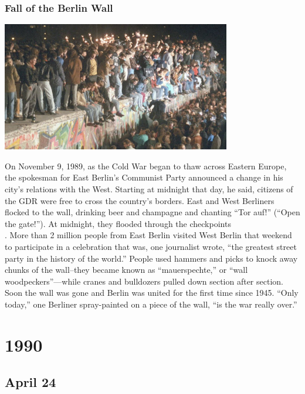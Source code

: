 \documentclass[11pt]{report}
\begin{document}
\subsection{Fall of the Berlin Wall}
\vspace{2mm}\begin{center}\includegraphics[width=10cm]{./img/fallBerlinWall.jpg}\end{center}
On November 9, 1989, as the Cold War began to thaw across Eastern Europe, the spokesman for East Berlin’s Communist Party announced a change in his city’s relations with the West. Starting at midnight that day, he said, citizens of the GDR were free to cross the country’s borders. East and West Berliners flocked to the wall, drinking beer and champagne and chanting “Tor auf!” (“Open the gate!”). At midnight, they flooded through the checkpoints\\.
\indent More than 2 million people from East Berlin visited West Berlin that weekend to participate in a celebration that was, one journalist wrote, “the greatest street party in the history of the world.” People used hammers and picks to knock away chunks of the wall–they became known as “mauerspechte,” or “wall woodpeckers”—while cranes and bulldozers pulled down section after section. Soon the wall was gone and Berlin was united for the first time since 1945. “Only today,” one Berliner spray-painted on a piece of the wall, “is the war really over.”

\chapter{1990}
\section{April 24}
\end{document}
